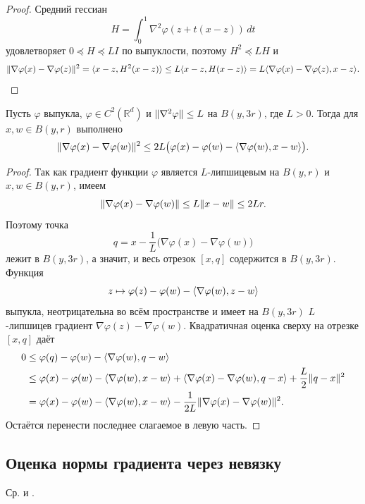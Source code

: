 \begin{proof}
Средний гессиан
\[
 H=\int_0^1\nabla^2\varphi(z+t(x-z))\,dt
\]
удовлетворяет $0\preceq H\preceq LI$ по выпуклости, поэтому
$H^2\preceq LH$ и
\[
 \lVert\nabla\varphi(x)-\nabla\varphi(z)\rVert^2
 =\langle x-z,H^2(x-z)\rangle
 \le L\langle x-z,H(x-z)\rangle
 =L\langle \nabla\varphi(x)-\nabla\varphi(z),x-z\rangle.
\]
\end{proof}

\begin{lemma}\label{lem:local-bregman}
Пусть $\varphi$ выпукла, $\varphi\in C^2(\mathbb R^d)$ и
$\lVert\nabla^2\varphi\rVert\le L$ на $B(y,3r)$, где $L>0$.
Тогда для $x,w\in B(y,r)$ выполнено
\[
 \lVert\nabla\varphi(x)-\nabla\varphi(w)\rVert^2
 \le2L\bigl(\varphi(x)-\varphi(w)
                     -\langle \nabla\varphi(w),x-w\rangle\bigr).
\]
\end{lemma}

\begin{proof}
Так как градиент функции $\varphi$ является $L$-липшицевым на $B(y,r)$
и $x,w\in B(y,r)$, имеем
\[
 \lVert\nabla\varphi(x)-\nabla\varphi(w)\rVert\le L\lVert x-w\rVert\le2Lr.
\]
Поэтому точка
\[
 q=x-\frac1L\bigl(\nabla\varphi(x)-\nabla\varphi(w)\bigr)
\]
лежит в $B(y,3r)$, а значит, и весь отрезок $[x,q]$ содержится в $B(y,3r)$.
Функция
\[
 z\mapsto\varphi(z)-\varphi(w)-\langle \nabla\varphi(w),z-w\rangle
\]
выпукла, неотрицательна во всём пространстве и имеет на $B(y,3r)$
$L$-липшицев градиент $\nabla\varphi(z)-\nabla\varphi(w)$.
Квадратичная оценка сверху на отрезке $[x,q]$ даёт
\begin{align*}
 0&\le\varphi(q)-\varphi(w)-\langle \nabla\varphi(w),q-w\rangle
 \\&\le\varphi(x)-\varphi(w)-\langle \nabla\varphi(w),x-w\rangle
   +\langle \nabla\varphi(x)-\nabla\varphi(w),q-x\rangle+\frac L2\lVert q-x\rVert^2
 \\&=\varphi(x)-\varphi(w)-\langle \nabla\varphi(w),x-w\rangle
   -\frac1{2L}\lVert\nabla\varphi(x)-\nabla\varphi(w)\rVert^2.
\end{align*}
Остаётся перенести последнее слагаемое в левую часть.
\end{proof}

\subsection{Оценка нормы градиента через невязку}

Ср. \citet{li2023generalized} и \citet[лемма~3.4]{yu2026mirror}.

